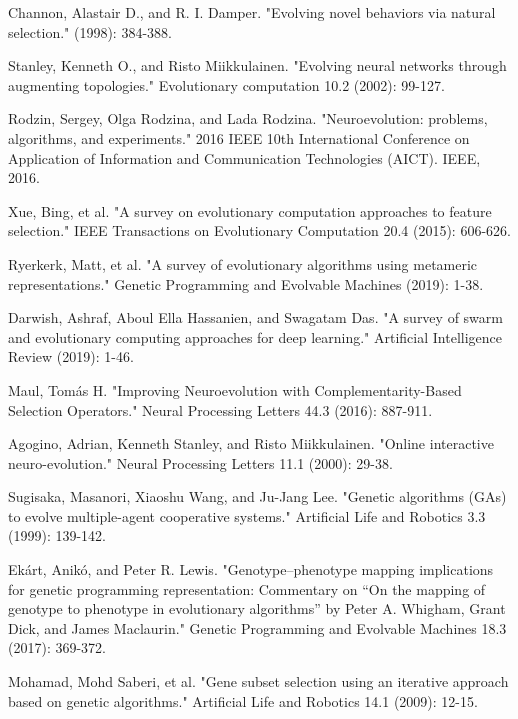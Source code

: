 \documentclass[conference]{IEEEtran}
\begin{document}
\begin{thebibliography}{9}
Channon, Alastair D., and R. I. Damper. "Evolving novel behaviors via natural selection." (1998): 384-388.
 
Stanley, Kenneth O., and Risto Miikkulainen. "Evolving neural networks through augmenting topologies." Evolutionary computation 10.2 (2002): 99-127.
 
Rodzin, Sergey, Olga Rodzina, and Lada Rodzina. "Neuroevolution: problems, algorithms, and experiments." 2016 IEEE 10th International Conference on Application of Information and Communication Technologies (AICT). IEEE, 2016.

Xue, Bing, et al. "A survey on evolutionary computation approaches to feature selection." IEEE Transactions on Evolutionary Computation 20.4 (2015): 606-626.

Ryerkerk, Matt, et al. "A survey of evolutionary algorithms using metameric representations." Genetic Programming and Evolvable Machines (2019): 1-38.

Darwish, Ashraf, Aboul Ella Hassanien, and Swagatam Das. "A survey of swarm and evolutionary computing approaches for deep learning." Artificial Intelligence Review (2019): 1-46.

Maul, Tomás H. "Improving Neuroevolution with Complementarity-Based Selection Operators." Neural Processing Letters 44.3 (2016): 887-911.

Agogino, Adrian, Kenneth Stanley, and Risto Miikkulainen. "Online interactive neuro-evolution." Neural Processing Letters 11.1 (2000): 29-38.

Sugisaka, Masanori, Xiaoshu Wang, and Ju-Jang Lee. "Genetic algorithms (GAs) to evolve multiple-agent cooperative systems." Artificial Life and Robotics 3.3 (1999): 139-142.

Ekárt, Anikó, and Peter R. Lewis. "Genotype–phenotype mapping implications for genetic programming representation: Commentary on “On the mapping of genotype to phenotype in evolutionary algorithms” by Peter A. Whigham, Grant Dick, and James Maclaurin." Genetic Programming and Evolvable Machines 18.3 (2017): 369-372.

Mohamad, Mohd Saberi, et al. "Gene subset selection using an iterative approach based on genetic algorithms." Artificial Life and Robotics 14.1 (2009): 12-15.


\end{thebibliography}
\end{document}
